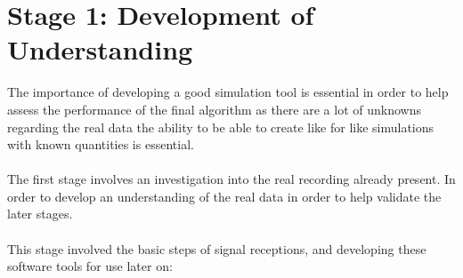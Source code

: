 \section{Stage 1: Development of Understanding}
The importance of developing a good simulation tool is essential in order to help assess the performance of the final algorithm as there are a lot of unknowns regarding the real data the ability to be able to create like for like simulations with known quantities is essential.
\\\\
The first stage involves an investigation into the real recording already present. In order to develop an understanding of the real data in order to help validate the later stages.
\\\\
This stage involved the basic steps of signal receptions, and developing these software tools for use later on:

